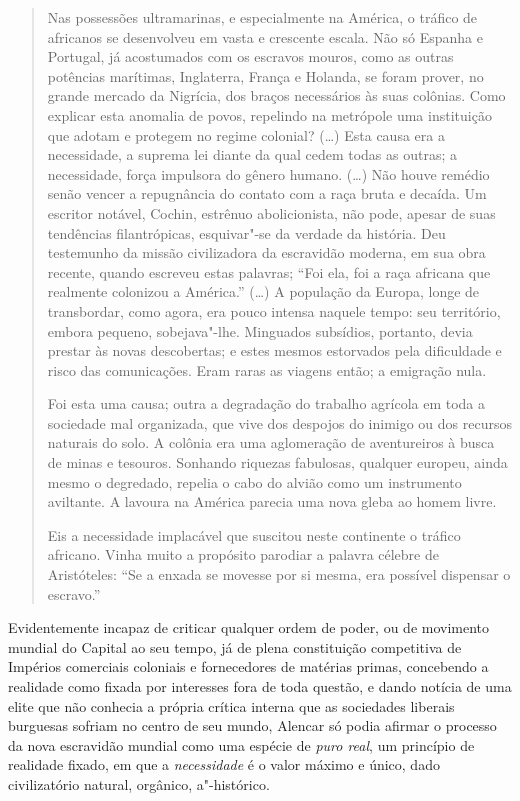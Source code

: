 \begin{quote}
Nas possessões ultramarinas, e especialmente na América, o tráfico de
africanos se desenvolveu em vasta e crescente escala. Não só Espanha e
Portugal, já acostumados com os escravos mouros, como as outras
potências marítimas, Inglaterra, França e Holanda, se foram prover, no
grande mercado da Nigrícia, dos braços necessários às suas colônias.
Como explicar esta anomalia de povos, repelindo na metrópole uma
instituição que adotam e protegem no regime colonial? (\ldots{}) Esta causa
era a necessidade, a suprema lei diante da qual cedem todas as outras; a
necessidade, força impulsora do gênero humano. (\ldots{}) Não houve remédio
senão vencer a repugnância do contato com a raça bruta e decaída. Um
escritor notável, Cochin, estrênuo abolicionista, não pode, apesar de
suas tendências filantrópicas, esquivar"-se da verdade da história. Deu
testemunho da missão civilizadora da escravidão moderna, em sua obra
recente, quando escreveu estas palavras; ``Foi ela, foi a raça africana
que realmente colonizou a América.'' (\ldots{}) A população da Europa, longe
de transbordar, como agora, era pouco intensa naquele tempo: seu
território, embora pequeno, sobejava"-lhe. Minguados subsídios, portanto,
devia prestar às novas descobertas; e estes mesmos estorvados pela
dificuldade e risco das comunicações. Eram raras as viagens então; a
emigração nula.

Foi esta uma causa; outra a degradação do trabalho
agrícola em toda a sociedade mal organizada, que vive dos despojos do
inimigo ou dos recursos naturais do solo. A colônia era uma aglomeração
de aventureiros à busca de minas e tesouros. Sonhando riquezas
fabulosas, qualquer europeu, ainda mesmo o degredado, repelia o cabo do
alvião como um instrumento aviltante. A lavoura na América parecia uma
nova gleba ao homem livre.

Eis a necessidade implacável que suscitou
neste continente o tráfico africano. Vinha muito a propósito parodiar a
palavra célebre de Aristóteles: ``Se a enxada se movesse por si mesma,
era possível dispensar o escravo.''
\end{quote}

Evidentemente incapaz de criticar qualquer ordem de poder, ou de
movimento mundial do Capital ao seu tempo, já de plena constituição
competitiva de Impérios comerciais coloniais e fornecedores de matérias
primas, concebendo a realidade como fixada por interesses fora de toda
questão, e dando notícia de uma elite que não conhecia a própria crítica
interna que as sociedades liberais burguesas sofriam no centro de seu
mundo, Alencar só podia afirmar o processo da nova escravidão mundial
como uma espécie de \emph{puro real}, um princípio de realidade fixado,
em que a \emph{necessidade} é o valor máximo e único, dado civilizatório
natural, orgânico, a"-histórico.

